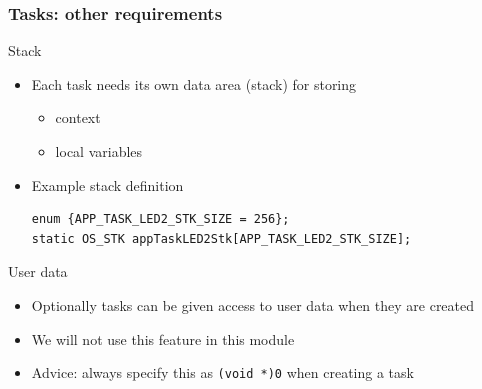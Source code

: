 \documentclass[hyperref={pdfpagelabels=false},svgnames]{beamer}
\begin{document}
\begin{frame}[fragile]
\frametitle{Tasks: other requirements}
\begin{block}{Stack}
\begin{itemize}
\item Each task needs its own data area (\alert{stack}) for storing
\begin{itemize}
\item context
\item local variables
\end{itemize}
\item Example stack definition

\begin{lstlisting}
enum {APP_TASK_LED2_STK_SIZE = 256};
static OS_STK appTaskLED2Stk[APP_TASK_LED2_STK_SIZE];
\end{lstlisting}

\end{itemize}
\end{block}

\pause

\begin{block}{User data}
\begin{itemize}
\item Optionally tasks can be given access to user data when
they are created
\item We will not use this feature in this module
\item Advice: always specify this as \verb'(void *)0' when
creating a task
\end{itemize}
\end{block}
\end{frame}
\end{document}
